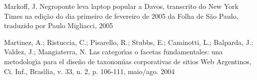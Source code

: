 \documentclass[
12pt,		%
openright,	%
twoside,  %
a4paper,			%
chapter=TITLE,		%
english,			%
french,				%
spanish,			%
brazil				%
]{USPSC-classe/USPSC}
\begin{document}
\begin{flushleft}
\begin{flushleft}
\begin{flushleft}
\begin{flushleft}
\begin{flushleft}
\begin{flushleft}
\begin{flushleft}
\begin{flushleft}
\begin{flushleft}
[MARKOFF, 2005] Markoff, J. Negroponte leva laptop popular a Davos, transcrito do New York Times na edi\c{c}\~ao do dia primeiro de fevereiro de 2005 da Folha de S\~ao Paulo, traduzido por Paulo Migliacci, 2005
\end{flushleft}


\end{flushleft}


\end{flushleft}


\end{flushleft}


\end{flushleft}


\end{flushleft}


\end{flushleft}


\end{flushleft}


\end{flushleft}


\begin{flushleft}
\begin{flushleft}
\begin{flushleft}
\begin{flushleft}
\begin{flushleft}
\begin{flushleft}
\begin{flushleft}
\begin{flushleft}
\begin{flushleft}
[MARTINEZ et al., 2004] Martinez, A.; Ristuccia, C.; Pisarello, R.; Stubbs, E.; Caminotti, L.; Balparda, J.; Valdez, J.; Mangiaterra, N. Las categor\'{\i}as o facetas fundamentales: una metodolog\'{\i}a para el diseño de taxonom\'{\i}as corporativas de sitios Web Argentinos, Ci. Inf., Bras\'{\i}lia, v. 33, n. 2, p. 106-111, maio/ago. 2004
\end{flushleft}


\end{flushleft}


\end{flushleft}


\end{flushleft}


\end{flushleft}


\end{flushleft}


\end{flushleft}


\end{flushleft}


\end{flushleft}
\end{document}
